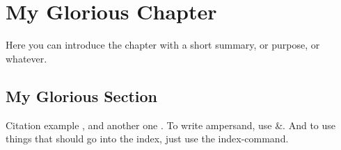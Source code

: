 \chapter{My Glorious Chapter}

Here you can introduce the chapter with a short summary, or purpose, or
whatever.

\section{My Glorious Section}

Citation example \cite[p.~42]{TagToUseInLatexDocs}, and another one
\cite{RealDonaldKnuth}. To write ampersand, use
\&{}. And to use things that should go into the index, just use
the index-command.
